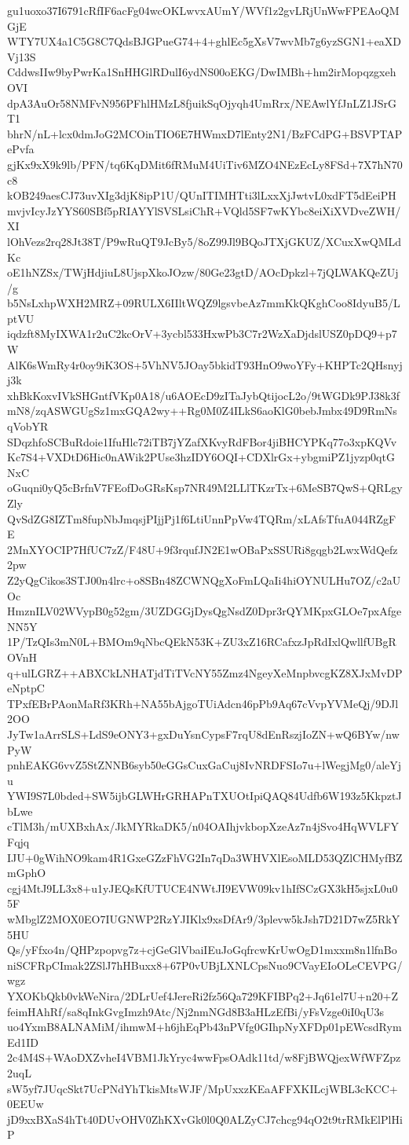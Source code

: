 gu1uoxo37I6791cRfIF6acFg04wcOKLwvxAUmY/WVf1z2gvLRjUnWwFPEAoQMGjE
WTY7UX4a1C5G8C7QdsBJGPueG74+4+ghlEc5gXsV7wvMb7g6yzSGN1+eaXDVj13S
CddwsIIw9byPwrKa1SnHHGlRDulI6ydNS00oEKG/DwIMBh+hm2irMopqzgxehOVI
dpA3AuOr58NMFvN956PFhlHMzL8fjuikSqOjyqh4UmRrx/NEAwlYfJnLZ1JSrGT1
bhrN/nL+lcx0dmJoG2MCOinTIO6E7HWmxD7lEnty2N1/BzFCdPG+BSVPTAPePvfa
gjKx9xX9k9lb/PFN/tq6KqDMit6fRMuM4UiTiv6MZO4NEzEcLy8FSd+7X7hN70c8
kOB249aesCJ73uvXIg3djK8ipP1U/QUnITIMHTti3lLxxXjJwtvL0xdFT5dEeiPH
mvjvIcyJzYYS60SBf5pRIAYYlSVSLsiChR+VQld5SF7wKYbc8eiXiXVDveZWH/XI
lOhVezs2rq28Jt38T/P9wRuQT9JcBy5/8oZ99Jl9BQoJTXjGKUZ/XCuxXwQMLdKc
oE1hNZSx/TWjHdjiuL8UjspXkoJOzw/80Ge23gtD/AOcDpkzl+7jQLWAKQeZUj/g
b5NsLxhpWXH2MRZ+09RULX6IIltWQZ9lgsvbeAz7mmKkQKghCoo8IdyuB5/LptVU
iqdzft8MyIXWA1r2uC2kcOrV+3ycbl533HxwPb3C7r2WzXaDjdslUSZ0pDQ9+p7W
AlK6sWmRy4r0oy9iK3OS+5VhNV5JOay5bkidT93HnO9woYFy+KHPTc2QHsnyjj3k
xhBkKoxvIVkSHGntfVKp0A18/u6AOEcD9zITaJybQtijocL2o/9tWGDk9PJ38k3f
mN8/zqASWGUgSz1mxGQA2wy++Rg0M0Z4ILkS6aoKlG0bebJmbx49D9RmNsqVobYR
SDqzhfoSCBuRdoie1IfuHlc72iTB7jYZafXKvyRdFBor4jiBHCYPKq77o3xpKQVv
Kc7S4+VXDtD6Hic0nAWik2PUse3hzIDY6OQI+CDXlrGx+ybgmiPZ1jyzp0qtGNxC
oGuqni0yQ5cBrfnV7FEofDoGRsKsp7NR49M2LLlTKzrTx+6MeSB7QwS+QRLgyZly
QvSdZG8IZTm8fupNbJmqsjPIjjPj1f6LtiUnnPpVw4TQRm/xLAfsTfuA044RZgFE
2MnXYOCIP7HfUC7zZ/F48U+9f3rqufJN2E1wOBaPxSSURi8gqgb2LwxWdQefz2pw
Z2yQgCikos3STJ00n4lrc+o8SBn48ZCWNQgXoFmLQaIi4hiOYNULHu7OZ/c2aUOc
HmznILV02WVypB0g52gm/3UZDGGjDysQgNsdZ0Dpr3rQYMKpxGLOe7pxAfgeNN5Y
1P/TzQIs3mN0L+BMOm9qNbcQEkN53K+ZU3xZ16RCafxzJpRdIxlQwllfUBgROVnH
q+ulLGRZ++ABXCkLNHATjdTiTVcNY55Zmz4NgeyXeMnpbvcgKZ8XJxMvDPeNptpC
TPxfEBrPAonMaRf3KRh+NA55bAjgoTUiAdcn46pPb9Aq67cVvpYVMeQj/9DJl2OO
JyTw1aArrSLS+LdS9eONY3+gxDuYsnCypsF7rqU8dEnRszjIoZN+wQ6BYw/nwPyW
pnhEAKG6vvZ5StZNNB6syb50eGGsCuxGaCuj8IvNRDFSIo7u+lWegjMg0/aleYju
YWI9S7L0bded+SW5ijbGLWHrGRHAPnTXUOtIpiQAQ84Udfb6W193z5KkpztJbLwe
cTlM3h/mUXBxhAx/JkMYRkaDK5/n04OAIhjvkbopXzeAz7n4jSvo4HqWVLFYFqjq
IJU+0gWihNO9kam4R1GxeGZzFhVG2In7qDa3WHVXlEsoMLD53QZlCHMyfBZmGphO
cgj4MtJ9LL3x8+u1yJEQsKfUTUCE4NWtJI9EVW09kv1hIfSCzGX3kH5sjxL0u05F
wMbglZ2MOX0EO7IUGNWP2RzYJIKlx9xsDfAr9/3plevw5kJsh7D21D7wZ5RkY5HU
Qs/yFfxo4n/QHPzpopvg7z+cjGeGlVbaiIEuJoGqfrcwKrUwOgD1mxxm8n1lfnBo
niSCFRpCImak2ZSlJ7hHBuxx8+67P0vUBjLXNLCpsNuo9CVayEIoOLeCEVPG/wgz
YXOKbQkb0vkWeNira/2DLrUef4JereRi2fz56Qa729KFIBPq2+Jq61el7U+n20+Z
feimHAhRf/sa8qInkGvgImzh9Atc/Nj2nmNGd8B3aHLzEfBi/yFsVzge0iI0qU3s
uo4YxmB8ALNAMiM/ihmwM+h6jhEqPb43nPVfg0GIhpNyXFDp01pEWcsdRymEd1ID
2c4M4S+WAoDXZvheI4VBM1JkYryc4wwFpsOAdk11td/w8FjBWQjexWfWFZpz2uqL
sW5yf7JUqcSkt7UcPNdYhTkisMtsWJF/MpUxxzKEaAFFXKILcjWBL3cKCC+0EEUw
jD9xxBXaS4hTt40DUvOHV0ZhKXvGk0l0Q0ALZyCJ7chcg94qO2t9trRMkElPlHiP

